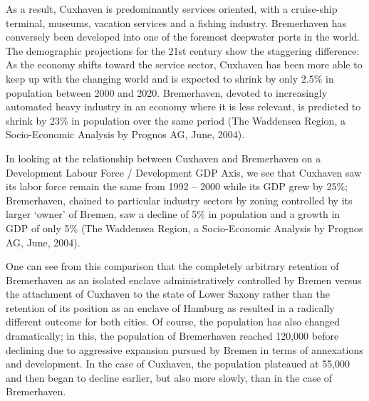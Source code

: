 As a result, Cuxhaven is predominantly services oriented, with a cruise-ship terminal, museums, vacation services and a fishing industry. Bremerhaven has conversely been developed into one of the foremost deepwater ports in the world. The demographic projections for the 21st century show the staggering difference: As the economy shifts toward the service sector, Cuxhaven has been more able to keep up with the changing world and is expected to shrink by only 2.5\% in population between 2000 and 2020. Bremerhaven, devoted to increasingly automated heavy industry in an economy where it is less relevant, is predicted to shrink by 23\% in population over the same period (The Waddensea Region, a Socio-Economic Analysis by Prognos AG, June, 2004).

In looking at the relationship between Cuxhaven and Bremerhaven on a Development Labour Force / Development GDP Axis, we see that Cuxhaven saw its labor force remain the same from 1992 – 2000 while its GDP grew by 25\%; Bremerhaven, chained to particular industry sectors by zoning controlled by its larger ‘owner’ of Bremen, saw a decline of 5\% in population and a growth in GDP of only 5\% (The Waddensea Region, a Socio-Economic Analysis by Prognos AG, June, 2004).

One can see from this comparison that the completely arbitrary retention of Bremerhaven as an isolated enclave administratively controlled by Bremen versus the attachment of Cuxhaven to the state of Lower Saxony rather than the retention of its position as an enclave of Hamburg as resulted in a radically different outcome for both cities. Of course, the population has also changed dramatically; in this, the population of Bremerhaven reached 120,000 before declining due to aggressive expansion pursued by Bremen in terms of annexations and development. In the case of Cuxhaven, the population plateaued at 55,000 and then began to decline earlier, but also more slowly, than in the case of Bremerhaven.


